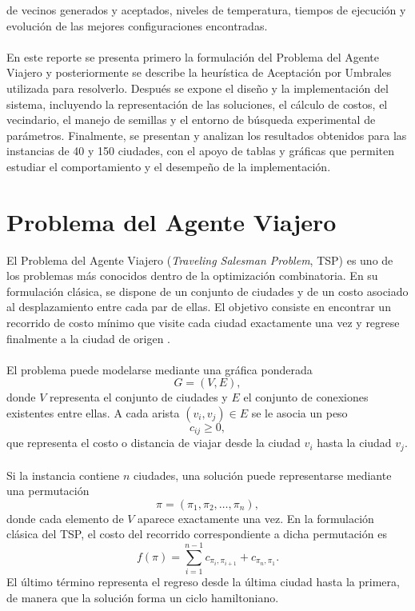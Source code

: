 \documentclass[12pt]{article}
\begin{document}
de vecinos generados y aceptados, niveles de temperatura, tiempos de
ejecución y evolución de las mejores configuraciones encontradas.
\\\\
En este reporte se presenta primero la formulación del Problema del Agente
Viajero y posteriormente se describe la heurística de Aceptación por
Umbrales utilizada para resolverlo. Después se expone el diseño y la
implementación del sistema, incluyendo la representación de las soluciones,
el cálculo de costos, el vecindario, el manejo de semillas y el entorno de
búsqueda experimental de parámetros. Finalmente, se presentan y analizan
los resultados obtenidos para las instancias de 40 y 150 ciudades, con el
apoyo de tablas y gráficas que permiten estudiar el comportamiento y el
desempeño de la implementación.

\clearpage

\section{Problema del Agente Viajero}
\label{sec:tsp}

El Problema del Agente Viajero
(\textit{Traveling Salesman Problem}, TSP) es uno de los problemas más
conocidos dentro de la optimización combinatoria. En su formulación clásica,
se dispone de un conjunto de ciudades y de un costo asociado al
desplazamiento entre cada par de ellas. El objetivo consiste en encontrar un
recorrido de costo mínimo que visite cada ciudad exactamente una vez y
regrese finalmente a la ciudad de origen \cite{lawler1985tsp}.
\\\\
El problema puede modelarse mediante una gráfica ponderada
\[
    G=(V,E),
\]
donde \(V\) representa el conjunto de ciudades y \(E\) el conjunto de
conexiones existentes entre ellas. A cada arista
\((v_i,v_j)\in E\) se le asocia un peso
\[
    c_{ij}\geq 0,
\]
que representa el costo o distancia de viajar desde la ciudad \(v_i\) hasta
la ciudad \(v_j\).
\\\\
Si la instancia contiene \(n\) ciudades, una solución puede representarse
mediante una permutación
\[
    \pi =
    \left(
        \pi_1,\pi_2,\ldots,\pi_n
    \right),
\]
donde cada elemento de \(V\) aparece exactamente una vez. En la formulación
clásica del TSP, el costo del recorrido correspondiente a dicha permutación
es
\[
    f(\pi)
    =
    \sum_{i=1}^{n-1}
    c_{\pi_i,\pi_{i+1}}
    +
    c_{\pi_n,\pi_1}.
\]
El último término representa el regreso desde la última ciudad hasta la
primera, de manera que la solución forma un ciclo hamiltoniano.
\end{document}
